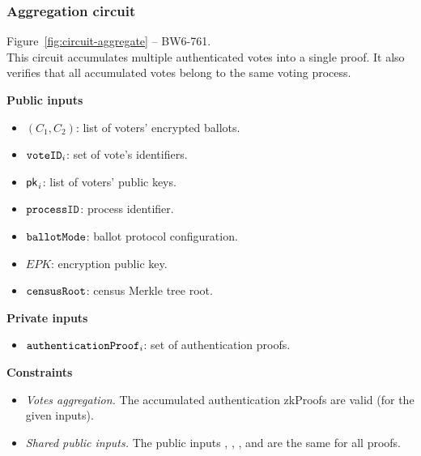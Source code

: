 \newpage
\subsubsection{Aggregation circuit}

Figure~\ref{fig:circuit-aggregate} -- BW6-761.\\

\noi This circuit accumulates multiple authenticated votes into a single proof. It also verifies that all accumulated votes belong to the same voting process.



\begin{spacing}{1.25}
	\vspace{0.3cm}
	\noi \textbf{Public inputs}
	\begin{itemize}
		\item \public $(C_1, C_2)$: list of voters' encrypted ballots.
		\item \public $\texttt{voteID}_i$: set of vote's identifiers.
		\item \public ${\sf{pk}^{}}_i$: list of voters' public keys.
		\item \public $\texttt{processID}$: process identifier.
		\item \public $\texttt{ballotMode}$: ballot protocol configuration.
		\item \public $EPK$: encryption public key.
		\item \public $\texttt{censusRoot}$: census Merkle tree root.
	\end{itemize}
	\textbf{Private inputs}
	\begin{itemize}								
		\item \private $\texttt{authenticationProof}_i$: set of authentication proofs.
	\end{itemize}
	\textbf{Constraints} \\ \vspace{-0.4cm}		
	\begin{itemize}
		\item \emph{Votes aggregation.} The accumulated authentication zkProofs are valid (for the given inputs).
		\item \emph{Shared public inputs.} The public inputs \processid, \ballotmode, \epk, and \censusroot are the same for all proofs.
	\end{itemize}
	\vspace{-0.3cm}
\end{spacing}

